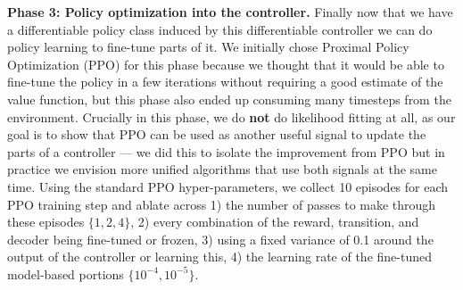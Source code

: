 \documentclass{article}
\begin{document}
\textbf{Phase 3: Policy optimization into the controller.}
Finally now that we have a differentiable policy class induced
by this differentiable controller we can do policy learning to
fine-tune parts of it.
We initially chose Proximal Policy Optimization (PPO) \citep{schulman2017proximal}
for this phase because we thought that it would be able to fine-tune
the policy in a few iterations without requiring a good
estimate of the value function, but this phase also ended up
consuming many timesteps from the environment.
Crucially in this phase, we do \textbf{not} do likelihood
fitting at all, as our goal is to show that PPO can be used
as another useful signal to update the parts of a controller ---
we did this to isolate the improvement from PPO but in practice
we envision more unified algorithms that use both
signals at the same time.
Using the standard PPO hyper-parameters, we collect 10
episodes for each PPO training step and ablate across
1) the number of passes to make through these episodes $\{1, 2, 4\}$,
2) every combination of the reward, transition, and decoder
being fine-tuned or frozen,
3) using a fixed variance of 0.1 around the output of
the controller or learning this,
4) the learning rate of the fine-tuned model-based portions
$\{10^{-4}, 10^{-5}\}$.
\end{document}

